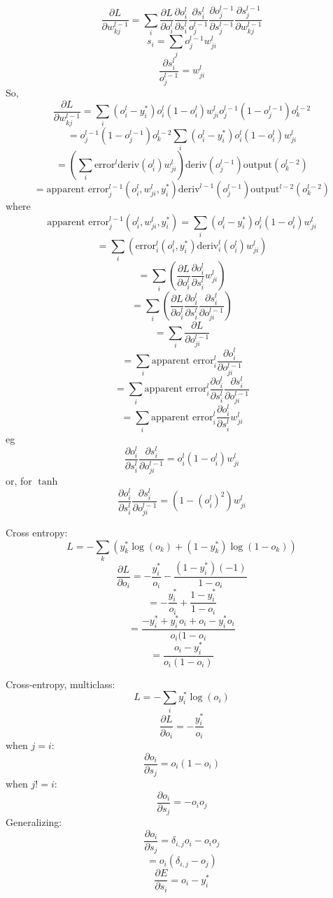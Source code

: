 \documentclass[a4paper,12pt,fleqn]{article}
\newcommand{\ult}{\vspace{12px}\noindent}
\begin{document}
\[ \frac{\partial L}{\partial w^{l-1}_{kj}} = \sum_i \frac{\partial L}{\partial o^l_i}
\frac{\partial o^l_i}{\partial s^l_i} \frac{\partial s^l_i}{o^{l-1}_j}\frac{\partial o^{l-1}_j}{\partial s^{l-1}_j}
\frac{\partial s^{l-1}_j}{\partial w^{l-1}_{kj}} \]
\[ s_i =  \sum_j o^{l-1}_j w^l_{ji} \]
\[ \frac{\partial s^l_i}{o^{l-1}_j} = w^l_{ji} \]
So, \[ \frac{\partial L}{\partial w^{l-1}_{kj}} =\sum_i (o^l_i - y^*_i)o^l_i(1-o^l_i)w^l_{ji}o^{l-1}_{j}(1 - o^{l-1}_{j})o^{l-2}_k \]
\[ = o^{l-1}_{j}(1 - o^{l-1}_{j})o^{l-2}_k \sum_i (o^l_i - y^*_i)o^l_i(1-o^l_i)w^l_{ji} \]
\[ = (\sum_i \text{error}^l \text{deriv}(o^l_i) w^l_{ji}) \text{deriv}(o^{l-1}_j) \text{output}(o^{l-2}_k)   \]
\[ = \text{apparent error}^{l-1}_j(o^l_i, w^l_{ji}, y^*_i) \text{deriv}^{l-1}(o^{l-1}_j) \text{output}^{l-2}(o^{l-2}_k) \]
where \[ \text{apparent error}^{l-1}_j(o^l_i, w^l_{ji}, y^*_i) = \sum_i (o^l_i - y^*_i)o^l_i(1-o^l_i)w^l_{ji} \]
\[ = \sum_i (\text{error}^l_i(o^l_i, y^*_i)\text{deriv}^l_i(o^l_i)w^l_{ji}) \]
\[ = \sum_i ( \frac{\partial L}{\partial o^l_i} \frac{\partial o^l_i}{\partial s^l_i} w^l_{ji} ) \]
\[ = \sum_i ( \frac{\partial L}{\partial o^l_i} \frac{\partial o^l_i}{\partial s^l_i} \frac{\partial s^l_i}{\partial o^{l-1}_{ji}} ) \]
\[ =\sum_i \frac{\partial L}{\partial o^{l-1}_{ji}} \]
\[ =\sum_i \text{apparent error}^l_i \frac{\partial o^l_i}{\partial o^{l-1}_{ji}} \]
\[ =\sum_i \text{apparent error}^l_i \frac{\partial o^l_i}{\partial s^l_i} \frac{\partial s^l_i}{\partial o^{l-1}_{ji}} \]
\[ =\sum_i \text{apparent error}^l_i \frac{\partial o^l_i}{\partial s^l_i} w^l_{ji} \]
eg \[ \frac{\partial o^l_i}{\partial s^l_i} \frac{\partial s^l_i}{\partial o^{l-1}_{ji}} 
= o^l_i(1-o^l_i) w^l_{ji} \]
or, for $\tanh$ \[ \frac{\partial o^l_i}{\partial s^l_i} \frac{\partial s^l_i}{\partial o^{l-1}_{ji}} 
= ( 1 - (o^l_i)^2) w^l_{ji} \]

\ult{Error functions}

Cross entropy: \[ L = - \sum_k ( y^*_k \log( o_k ) + ( 1 - y^*_k) \log(1 - o_k) ) \]
\[ \frac{\partial L}{\partial o_i} = - \frac{y^*_i}{o_i} - \frac{(1 - y^*_i)(-1)}{1 - o_i} \]
\[ = - \frac{y^*_i}{o_i} + \frac{1 - y^*_i}{1 - o_i} \]
\[ = \frac{-y^*_i + y^*_i o_i + o_i - y^*_i o_i}{o_i(1-o_i} \]
\[ = \frac{o_i - y^*_i}{o_i(1-o_i)} \]

Cross-entropy, multiclass: \[ L = - \sum_i y^*_i \log(o_i) \]
\[ \frac{\partial L}{\partial o_i} = - \frac{ y^*_i}{o_i}  \]
when $j = i$: \[ \frac{\partial o_i}{\partial s_j} = o_i(1-o_i) \]
when $j != i$: \[ \frac{\partial o_i}{\partial s_j} = -o_i o_j \]
Generalizing:
\[ \frac{\partial o_i}{\partial s_j} = \delta_{i,j}o_i - o_i o_j \]
\[ = o_i( \delta_{i,j} - o_j ) \]
\[ \frac{\partial E}{\partial s_i} = o_i - y^*_i \]
\end{document}
